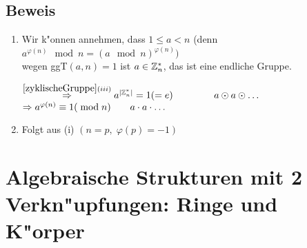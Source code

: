  
 \subsection{Beweis}
 \begin{enumerate}
 \item
 Wir k"onnen annehmen, dass $1 \leq a < n $ (denn $a^{\varphi(n)} \mod{n}= (a \mod{n})^{\varphi(n)})$\\
 wegen ggT$(a,n)=1$ ist $a \in \Z^*_n$, das ist eine endliche Gruppe.
 
 $\stackrel{\ref{zyklischeGruppe}(iii)}{\Rightarrow} a^{|\Z^*_n|}=1(=e) \hspace{1.5cm} a \odot a \odot \dots$\\
 $\Rightarrow a^{\varphi(n)} \equiv 1 (\mod{n}) \hspace{0.7cm} a \cdot a \cdot \dots $ 
 \item
 Folgt aus (i) $(n=p,\; \varphi (p) = -1)$

\end{enumerate}
\section{Algebraische Strukturen mit 2 Verkn"upfungen: Ringe und K"orper}

